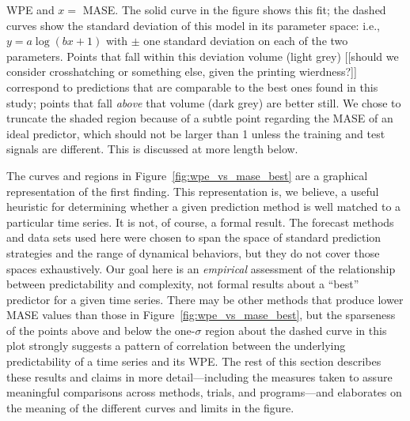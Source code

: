 WPE and $x=$ MASE.  The solid curve in the figure shows this fit; the
dashed curves show the standard deviation of this model in its
parameter space: i.e., $y = a \log(b x + 1)$ with $\pm$ one standard
deviation on each of the two parameters.  Points that fall within this
deviation volume (light grey) \alert{[[should we consider
      crosshatching or something else, given the printing
      wierdness?]]} correspond to predictions that are comparable to
the best ones found in this study; points that fall \emph{above} that
volume (dark grey) are better still.  We chose to truncate the shaded
region because of a subtle point regarding the MASE of an ideal
predictor, which should not be larger than 1 unless the training and
test signals are different.  This is discussed at more length below.

The curves and regions in Figure~\ref{fig:wpe_vs_mase_best} are a
graphical representation of the first finding.  This representation
is, we believe, a useful heuristic for determining whether a given
prediction method is well matched to a particular time series.  It is
not, of course, a formal result.  The forecast methods and data sets
used here were chosen to span the space of standard prediction
strategies and the range of dynamical behaviors, but they do not cover
those spaces exhaustively.  Our goal here is an \emph{empirical}
assessment of the relationship between predictability and complexity,
not formal results about a ``best'' predictor for a given time series.
There may be other methods that produce lower MASE values than those
in Figure~\ref{fig:wpe_vs_mase_best}, but the sparseness of the points
above and below the one-$\sigma$ region about the dashed curve in this
plot strongly suggests a pattern of correlation between the underlying
predictability of a time series and its WPE.  The rest of this section
describes these results and claims in more detail---including the
measures taken to assure meaningful comparisons across methods,
trials, and programs---and elaborates on the meaning of the different
curves and limits in the figure.


